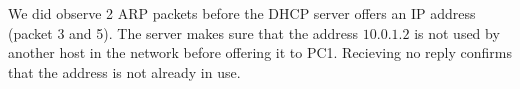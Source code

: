We did observe 2 ARP packets before the DHCP server offers an IP address (packet 3 and 5). The server makes sure that the address $10.0.1.2$ is not used by another host in the network before offering it to PC1. Recieving no reply confirms that the address is not already in use.
